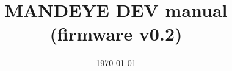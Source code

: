 \documentclass[a4paper,12pt]{book}
\begin{document}
\author{}
\title{MANDEYE DEV manual (firmware v0.2)}
\date{\today}

\frontmatter
\maketitle
\tableofcontents

\mainmatter



\backmatter
\end{document}

